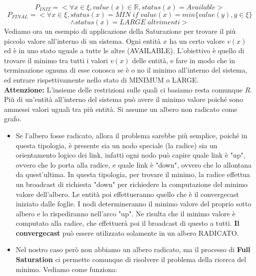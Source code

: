 $$P_{INIT} = < \forall x \in \xi, value(x) \in \mathbb{R}, status(x) =
    Available>$$
$$
    P_{FINAL} =   <
    \forall x \in \xi, status(x)= MIN \; if \; value(x) = min
    \{value(y), y \in \xi \}$$$$ \wedge status(x) = LARGE \;altrimenti >$$
Vediamo ora un esempio di applicazione della Saturazione per trovare il più
piccolo valore all'interno di un sistema. Ogni entità $x$ ha un certo valore
$v(x)$ ed è in uno stato uguale a tutte le altre (AVAILABLE). L'obiettivo è
quello di trovare il minimo tra tutti i valori $v(x)$ delle entità, e fare in
modo che in terminazione ognuna di esse conosca se è o no il minimo all'interno
del sistema, ed entrare rispettivamente nello stato di MINIMUM o LARGE.\\
\textbf{Attenzione:} L'insieme delle restrizioni sulle quali ci basiamo resta
comunque $R$. Più di un'entità all'interno del sistema può avere il minimo
valore poiché sono ammessi valori uguali tra più entità. Si assume un albero non
radicato come grafo.\\
\begin{itemize}
    \item Se l'albero fosse radicato, allora il problema sarebbe più semplice,
          poiché in questa tipologia, è presente sia un nodo speciale (la radice) sia un
          orientamento logico dei link, infatti ogni nodo può capire quale link è "up",
          ovvero che lo porta alla radice, e quale link è "down", ovvero che lo
          allontana da quest'ultima. In questa tipologia, per trovare il minimo, la
          radice effettua un broadcast di richiesta "down" per richiedere la
          computazione del minimo valore dell'albero. Le entità poi effettueranno quello
          che è il convergecast iniziato dalle foglie. I nodi determineranno il minimo
          valore del proprio sotto albero e lo rispediranno nell'arco "up". Ne risulta
          che il minimo valore è computato alla radice, che effettuerà poi il broadcast
          di questo a tutti. \textbf{Il convergecast} può essere utilizzato solamente in
          un albero RADICATO.
    \item Nel nostro caso però non abbiamo un albero radicato, ma il processo di
          \textbf{Full Saturation} ci permette comunque di risolvere il problema della
          ricerca del minimo. Vediamo come funziona:
\end{itemize}

